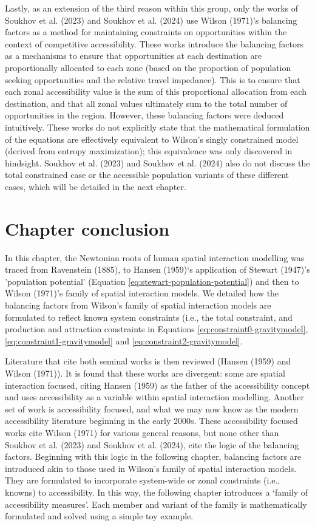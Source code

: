 \documentclass[
11pt, %
oneside, %
english, %
singlespacing, %
]{macthesis} %
\begin{document}
Lastly, as an extension of the third reason within this group, only the works of Soukhov et al. (2023) and Soukhov et al. (2024) use Wilson (1971)'s balancing factors as a method for maintaining constraints on opportunities within the context of competitive accessibility. These works introduce the balancing factors as a mechanisms to ensure that opportunities at each destination are proportionally allocated to each zone (based on the proportion of population seeking opportunities and the relative travel impedance). This is to ensure that each zonal accessibility value is the sum of this proportional allocation from each destination, and that all zonal values ultimately sum to the total number of opportunities in the region. However, these balancing factors were deduced intuitively. These works do not explicitly state that the mathematical formulation of the equations are effectively equivalent to Wilson's singly constrained model (derived from entropy maximization); this equivalence was only discovered in hindsight. Soukhov et al. (2023) and Soukhov et al. (2024) also do not discuss the total constrained case or the accessible population variants of these different cases, which will be detailed in the next chapter.

\section{Chapter conclusion}\label{chapter-conclusion}

In this chapter, the Newtonian roots of human spatial interaction modelling was traced from Ravenstein (1885), to Hansen (1959)`s application of Stewart (1947)'s 'population potential' (Equation \ref{eq:stewart-population-potential}) and then to Wilson (1971)'s family of spatial interaction models. We detailed how the balancing factors from Wilson's family of spatial interaction models are formulated to reflect known system constraints (i.e., the total constraint, and production and attraction constraints in Equations \ref{eq:constraint0-gravitymodel}, \ref{eq:constraint1-gravitymodel} and \ref{eq:constraint2-gravitymodel}.

Literature that cite both seminal works is then reviewed (Hansen (1959) and Wilson (1971)). It is found that these works are divergent: some are spatial interaction focused, citing Hansen (1959) as the father of the accessibility concept and uses accessibility as a variable within spatial interaction modelling. Another set of work is accessibility focused, and what we may now know as the modern accessibility literature beginning in the early 2000s. These accessibility focused works cite Wilson (1971) for various general reasons, but none other than Soukhov et al. (2023) and Soukhov et al. (2024), cite the logic of the balancing factors. Beginning with this logic in the following chapter, balancing factors are introduced akin to those used in Wilson's family of spatial interaction models. They are formulated to incorporate system-wide or zonal constraints (i.e., knowns) to accessibility. In this way, the following chapter introduces a `family of accessibility measures'. Each member and variant of the family is mathematically formulated and solved using a simple toy example.
\end{document}
